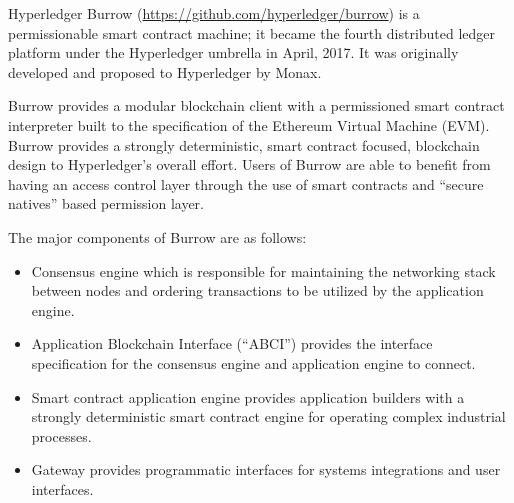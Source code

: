 Hyperledger Burrow (\url{https://github.com/hyperledger/burrow}) is a permissionable smart contract machine; it became the fourth distributed ledger platform under the Hyperledger umbrella in April, 2017. It was originally developed and proposed to Hyperledger by Monax.

Burrow provides a modular blockchain client with a permissioned smart contract interpreter built to the specification of the Ethereum Virtual Machine (EVM). Burrow provides a strongly deterministic, smart contract focused, blockchain design to Hyperledger's overall effort. Users of Burrow are able to benefit from having an access control layer through the use of smart contracts and “secure natives” based permission layer.

The major components of Burrow are as follows:
\begin{itemize}
\item Consensus engine which is responsible for maintaining the networking stack between nodes and ordering transactions to be utilized by the application engine.
\item Application Blockchain Interface (“ABCI”) provides the interface specification for the consensus engine and application engine to connect.
\item Smart contract application engine provides application builders with a strongly deterministic smart contract engine for operating complex industrial processes.
\item Gateway provides programmatic interfaces for systems integrations and user interfaces.
\end{itemize}
